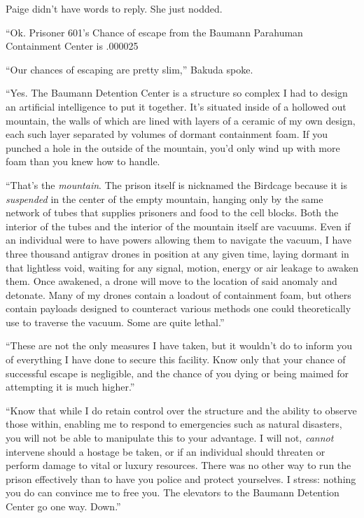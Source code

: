 Paige didn't have words to reply.  She just nodded.



``Ok.  Prisoner 601's Chance of escape from the Baumann Parahuman Containment Center is .000025%



``Our chances of escaping are pretty slim,'' Bakuda spoke.



``Yes.  The Baumann Detention Center is a structure so complex I had to design an artificial intelligence to put it together.  It's situated inside of a hollowed out mountain, the walls of which are lined with layers of a ceramic of my own design, each such layer separated by volumes of dormant containment foam.  If you punched a hole in the outside of the mountain, you'd only wind up with more foam than you knew how to handle.



``That's the \emph{mountain}.  The prison itself is nicknamed the Birdcage because it is \emph{suspended} in the center of the empty mountain, hanging only by the same network of tubes that supplies prisoners and food to the cell blocks.  Both the interior of the tubes and the interior of the mountain itself are vacuums.  Even if an individual were to have powers allowing them to navigate the vacuum, I have three thousand antigrav drones in position at any given time, laying dormant in that lightless void, waiting for any signal, motion, energy or air leakage to awaken them.  Once awakened, a drone will move to the location of said anomaly and detonate.  Many of my drones contain a loadout of containment foam, but others contain payloads designed to counteract various methods one could theoretically use to traverse the vacuum.  Some are quite lethal.''



``These are not the only measures I have taken, but it wouldn't do to inform you of everything I have done to secure this facility.  Know only that your chance of successful escape is negligible, and the chance of you dying or being maimed for attempting it is much higher.''



``Know that while I do retain control over the structure and the ability to observe those within, enabling me to respond to emergencies such as natural disasters, you will not be able to manipulate this to your advantage.  I will not, \emph{cannot} intervene should a hostage be taken, or if an individual should threaten or perform damage to vital or luxury resources.  There was no other way to run the prison effectively than to have you police and protect yourselves.  I stress: nothing you do can convince me to free you.  The elevators to the Baumann Detention Center go one way.  Down.''



